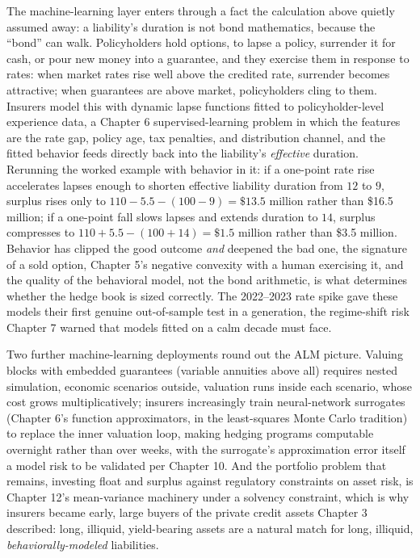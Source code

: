 \documentclass[../ai_in_finance]{subfiles}
\begin{document}
The machine-learning layer enters through a fact the calculation above quietly assumed away: a liability's duration is not bond mathematics, because the ``bond'' can walk. Policyholders hold options, to lapse a policy, surrender it for cash, or pour new money into a guarantee, and they exercise them in response to rates: when market rates rise well above the credited rate, surrender becomes attractive; when guarantees are above market, policyholders cling to them. Insurers model this with dynamic lapse functions fitted to policyholder-level experience data, a Chapter 6 supervised-learning problem in which the features are the rate gap, policy age, tax penalties, and distribution channel, and the fitted behavior feeds directly back into the liability's \emph{effective} duration. Rerunning the worked example with behavior in it: if a one-point rate rise accelerates lapses enough to shorten effective liability duration from $12$ to $9$, surplus rises only to $110 - 5.5 - (100 - 9) = \$13.5$ million rather than \$16.5 million; if a one-point fall slows lapses and extends duration to $14$, surplus compresses to $110 + 5.5 - (100 + 14) = \$1.5$ million rather than \$3.5 million. Behavior has clipped the good outcome \emph{and} deepened the bad one, the signature of a sold option, Chapter 5's negative convexity with a human exercising it, and the quality of the behavioral model, not the bond arithmetic, is what determines whether the hedge book is sized correctly. The 2022--2023 rate spike gave these models their first genuine out-of-sample test in a generation, the regime-shift risk Chapter 7 warned that models fitted on a calm decade must face.

Two further machine-learning deployments round out the ALM picture. Valuing blocks with embedded guarantees (variable annuities above all) requires nested simulation, economic scenarios outside, valuation runs inside each scenario, whose cost grows multiplicatively; insurers increasingly train neural-network surrogates (Chapter 6's function approximators, in the least-squares Monte Carlo tradition) to replace the inner valuation loop, making hedging programs computable overnight rather than over weeks, with the surrogate's approximation error itself a model risk to be validated per Chapter 10. And the portfolio problem that remains, investing float and surplus against regulatory constraints on asset risk, is Chapter 12's mean-variance machinery under a solvency constraint, which is why insurers became early, large buyers of the private credit assets Chapter 3 described: long, illiquid, yield-bearing assets are a natural match for long, illiquid, \emph{behaviorally-modeled} liabilities.
\end{document}
